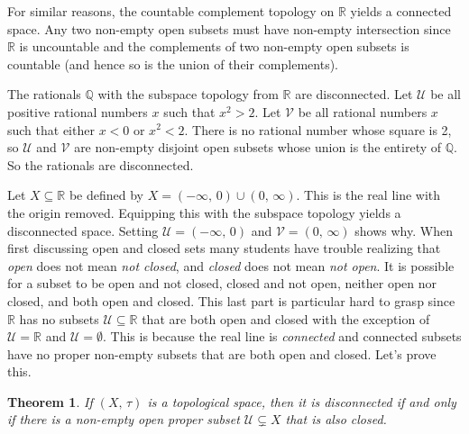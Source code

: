 \documentclass{article}
\theoremstyle{plain}
\newtheorem{theorem}{Theorem}[section]
\theoremstyle{normal}
\newenvironment{example}{%
    \pushQED{\qed}\renewcommand{\qedsymbol}{$\blacksquare$}\examplex%
}{%
    \popQED\endexamplex%
}
\begin{document}
        \begin{example}
            For similar reasons, the countable complement topology on
            $\mathbb{R}$ yields a connected space. Any two non-empty open
            subsets must have non-empty intersection since $\mathbb{R}$ is
            uncountable and the complements of two non-empty open subsets is
            countable (and hence so is the union of their complements).
        \end{example}
        \begin{example}
            The rationals $\mathbb{Q}$ with the subspace topology from
            $\mathbb{R}$ are disconnected. Let $\mathcal{U}$ be all positive
            rational numbers $x$ such that $x^{2}>2$. Let $\mathcal{V}$ be
            all rational numbers $x$ such that either $x<0$ or $x^{2}<2$. There
            is no rational number whose square is 2, so $\mathcal{U}$ and
            $\mathcal{V}$ are non-empty disjoint open subsets whose union is
            the entirety of $\mathbb{Q}$. So the rationals are disconnected. 
        \end{example}
        \begin{example}
            Let $X\subseteq\mathbb{R}$ be defined by
            $X=(-\infty,\,0)\cup(0,\,\infty)$. This is the real line with the
            origin removed. Equipping this with the subspace topology yields a
            disconnected space. Setting $\mathcal{U}=(-\infty,\,0)$ and
            $\mathcal{V}=(0,\,\infty)$ shows why.
        \end{example}
        When first discussing open and closed sets many students have trouble
        realizing that \textit{open} does not mean \textit{not closed}, and
        \textit{closed} does not mean \textit{not open}. It is possible for a
        subset to be open and not closed, closed and not open, neither open nor
        closed, and both open and closed. This last part is particular hard to
        grasp since $\mathbb{R}$ has no subsets $\mathcal{U}\subseteq\mathbb{R}$
        that are both open and closed with the exception of
        $\mathcal{U}=\mathbb{R}$ and $\mathcal{U}=\emptyset$. This is because
        the real line is \textit{connected} and connected subsets have no
        proper non-empty subsets that are both open and closed. Let's prove
        this.
        \begin{theorem}
            If $(X,\,\tau)$ is a topological space, then it is disconnected
            if and only if there is a non-empty open proper subset
            $\mathcal{U}\subsetneq{X}$ that is also closed.
        \end{theorem}
\end{document}
